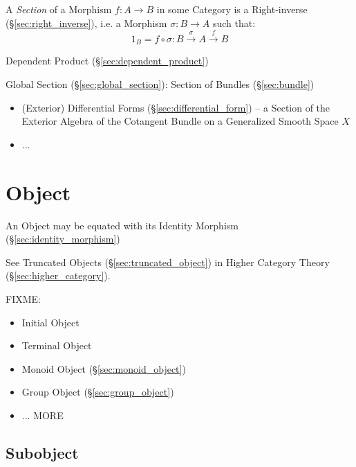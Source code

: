 A \emph{Section} of a Morphism $f : A \rightarrow B$ in some Category is a
Right-inverse (\S\ref{sec:right_inverse}), i.e. a Morphism $\sigma : B
\rightarrow A$ such that:
\[
  1_B = f \circ \sigma : B \xrightarrow{\sigma} A \xrightarrow{f} B
\]

Dependent Product (\S\ref{sec:dependent_product})

Global Section (\S\ref{sec:global_section}): Section of Bundles
(\S\ref{sec:bundle})

\begin{itemize}
  \item (Exterior) Differential Forms (\S\ref{sec:differential_form}) -- a
    Section of the Exterior Algebra of the Cotangent Bundle on a Generalized
    Smooth Space $X$
  \item ...
\end{itemize}



\section{Object}\label{sec:category_object}

An Object may be equated with its Identity Morphism
(\S\ref{sec:identity_morphism})

\fist See Truncated Objects (\S\ref{sec:truncated_object}) in Higher
Category Theory (\S\ref{sec:higher_category}).

FIXME:

\begin{itemize}
  \item Initial Object
  \item Terminal Object
  \item Monoid Object (\S\ref{sec:monoid_object})
  \item Group Object (\S\ref{sec:group_object})
  \item ... MORE
\end{itemize}



\subsection{Subobject}\label{sec:subobject}

